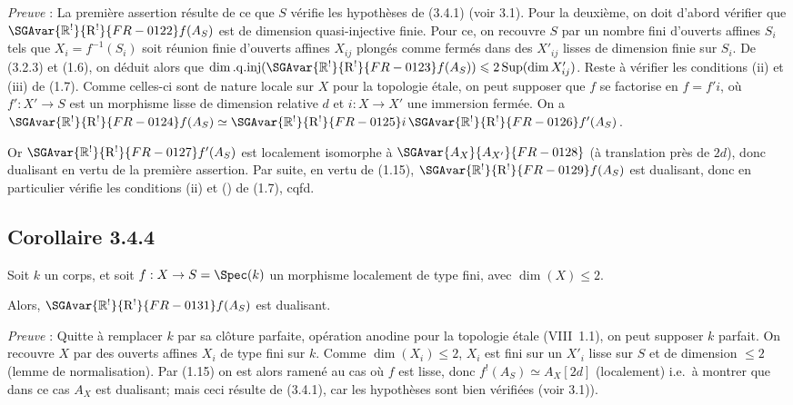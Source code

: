 \emph{Preuve} : La première assertion résulte de ce que $S$ vérifie les hypothèses de (3.4.1) (voir 3.1). Pour la deuxième, on doit d'abord vérifier que $\SGAvar{\mathbb{R}^{!}}{\mathrm{R}^{!}}{FR-0122}f(A_S)$ est de dimension quasi-injective finie. Pour ce, on recouvre $S$ par un nombre fini d'ouverts affines $S_i$ tels que $X_i = f^{-1}(S_i)$ soit réunion finie d'ouverts affines $X_{ij}$ plongés comme fermés dans des $X'_{ij}$ lisses de dimension finie sur $S_i$. De (3.2.3) et (1.6), on déduit alors que $\dim.\mathrm{q.inj}(\SGAvar{\mathbb{R}^{!}}{\mathrm{R}^{!}}{FR-0123}f(A_S)) \leqslant 2\operatorname{Sup}(\dim X'_{ij})$. Reste à vérifier les conditions (ii) et (iii) de (1.7). Comme celles-ci sont de nature locale sur $X$ pour la topologie étale, on peut supposer que $f$ se factorise en $f = f'i$, où $f' : X' \to S$ est un morphisme lisse de dimension relative $d$ et $i : X \to X'$ une immersion fermée. On a $\SGAvar{\mathbb{R}^{!}}{\mathrm{R}^{!}}{FR-0124}f(A_S) \simeq \SGAvar{\mathbb{R}^{!}}{\mathrm{R}^{!}}{FR-0125}i \, \SGAvar{\mathbb{R}^{!}}{\mathrm{R}^{!}}{FR-0126}f'(A_S)$.

Or $\SGAvar{\mathbb{R}^{!}}{\mathrm{R}^{!}}{FR-0127}f'(A_S)$ est localement isomorphe à $\SGAvar{A_X}{A_{X'}}{FR-0128}$ (à translation près de $2d$), donc dualisant en vertu de la première assertion. Par suite, en vertu de (1.15), $\SGAvar{\mathbb{R}^{!}}{\mathrm{R}^{!}}{FR-0129}f(A_S)$ est dualisant, donc en particulier vérifie les conditions (ii) et () de (1.7), cqfd.

\subsection*{Corollaire 3.4.4}
Soit $k$ un corps, et soit $f : X \to S = \Spec(k)$ un morphisme localement de type fini, avec $\dim(X) \leqslant 2$.

Alors, $\SGAvar{\mathbb{R}^{!}}{\mathrm{R}^{!}}{FR-0131}f(A_S)$ est dualisant.

\emph{Preuve} : Quitte à remplacer $k$ par sa clôture parfaite, opération anodine pour la topologie étale (VIII~1.1), on peut supposer $k$ parfait. On recouvre $X$ par des ouverts affines $X_i$ de type fini sur $k$. Comme $\dim(X_i) \leqslant 2$, $X_i$ est fini sur un $X'_i$ lisse sur $S$ et de dimension $\leqslant 2$ (lemme de normalisation). Par (1.15) on est alors ramené au cas où $f$ est lisse, donc $f^{!}(A_S) \simeq A_X[2d]$ (localement) i.e.~à montrer que dans ce cas $A_X$ est dualisant; mais ceci résulte de (3.4.1), car les hypothèses sont bien vérifiées (voir 3.1)).

